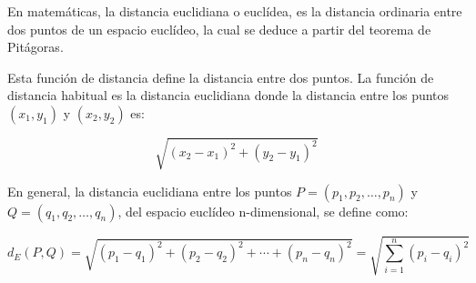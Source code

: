 En matemáticas, la distancia euclidiana o euclídea, es la distancia ordinaria entre dos puntos de un espacio euclídeo, la cual se deduce a partir del teorema de Pitágoras. 

Esta función de distancia define la distancia entre dos puntos. La función de distancia habitual es la distancia euclidiana donde la distancia entre los puntos $(x_1, y_1)$ y $(x_2, y_2)$ es:

$$\sqrt{(x_2-x_1)^2 + (y_2-y_1)^2}$$

En general, la distancia euclidiana entre los puntos $P=(p_1,p_2,\dots,p_n)$ y 
$Q=(q_1,q_2,\dots ,q_n)$, del espacio euclídeo n-dimensional, se define como: 

$$d_E(P,Q)=\sqrt{(p_1-q_1)^2 + (p_2-q_2)^2 + \cdots + (p_n-q_n)^2} = \sqrt{\sum_{i=1}^n (p_i-q_i)^2}$$